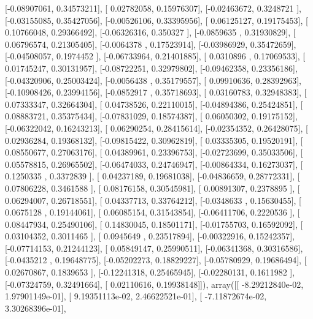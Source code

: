\documentclass{article}
\begin{document}
       [-0.08907061,  0.34573211],
       [ 0.02782058,  0.15976307],
       [-0.02463672,  0.3248721 ],
       [-0.03155085,  0.35427056],
       [-0.00526106,  0.33395956],
       [ 0.06125127,  0.19175453],
       [ 0.10766048,  0.29366492],
       [-0.06326316,  0.350327  ],
       [-0.0859635 ,  0.31930829],
       [ 0.06796574,  0.21305405],
       [-0.0064378 ,  0.17523914],
       [-0.03986929,  0.35472659],
       [-0.04508057,  0.1974452 ],
       [-0.06733964,  0.21401885],
       [ 0.0310896 ,  0.17069533],
       [ 0.01745247,  0.30131957],
       [-0.08722251,  0.32979802],
       [-0.09462358,  0.23356186],
       [-0.04320906,  0.25003424],
       [-0.0056438 ,  0.35179557],
       [ 0.09910636,  0.28392963],
       [-0.10908426,  0.23994156],
       [-0.0852917 ,  0.35718693],
       [ 0.03160783,  0.32948383],
       [ 0.07333347,  0.32664304],
       [ 0.04738526,  0.22110015],
       [-0.04894386,  0.25424851],
       [ 0.08883721,  0.35375434],
       [-0.07831029,  0.18574387],
       [ 0.06050302,  0.19175152],
       [-0.06322042,  0.16243213],
       [ 0.06290254,  0.28415614],
       [-0.02354352,  0.26428075],
       [ 0.02936284,  0.19368132],
       [-0.09815422,  0.30962819],
       [ 0.03335305,  0.19520191],
       [ 0.08550677,  0.27063176],
       [ 0.04389961,  0.23396753],
       [-0.02723699,  0.35033506],
       [ 0.05578815,  0.26965502],
       [-0.06474033,  0.24746947],
       [-0.00864334,  0.16273037],
       [ 0.1250335 ,  0.3372839 ],
       [ 0.04237189,  0.19681038],
       [-0.04836659,  0.28772331],
       [ 0.07806228,  0.3461588 ],
       [ 0.08176158,  0.30545981],
       [ 0.00891307,  0.2378895 ],
       [ 0.06294007,  0.26718551],
       [ 0.04337713,  0.33764212],
       [-0.0348633 ,  0.15630455],
       [ 0.0675128 ,  0.19144061],
       [ 0.06085154,  0.31543854],
       [-0.06411706,  0.2220536 ],
       [ 0.08447934,  0.25490106],
       [ 0.14830045,  0.18501171],
       [-0.01755703,  0.16592092],
       [ 0.03104352,  0.3011465 ],
       [ 0.0945649 ,  0.23517894],
       [-0.00322916,  0.15242357],
       [-0.07714153,  0.21244123],
       [ 0.05849147,  0.25990511],
       [-0.06341368,  0.30316586],
       [-0.0435212 ,  0.19648775],
       [-0.05202273,  0.18829227],
       [-0.05780929,  0.19686494],
       [ 0.02670867,  0.1839653 ],
       [-0.12241318,  0.25465945],
       [-0.02280131,  0.1611982 ],
       [-0.07324759,  0.32491664],
       [ 0.02110616,  0.19938148]]), array([[ -8.29212840e-02,   1.97901149e-01],
       [  9.19351113e-02,   2.46622521e-01],
       [ -7.11872674e-02,   3.30268396e-01],
\end{document}
